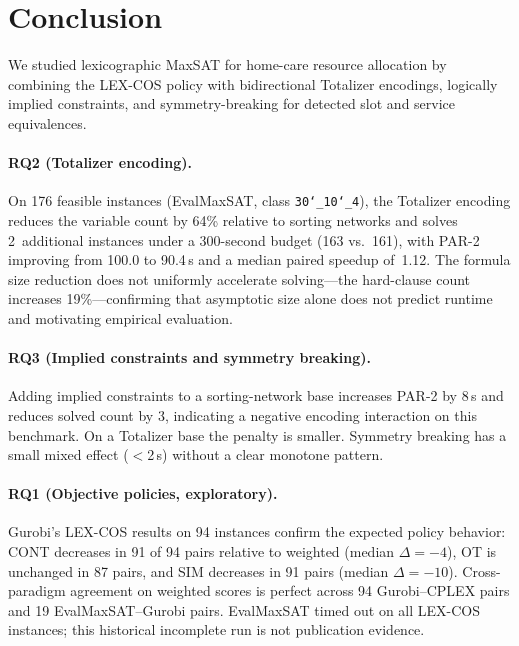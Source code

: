 
\section{Conclusion}
\label{sec:conclusion}

We studied lexicographic MaxSAT for home-care resource allocation by combining
the LEX-COS policy with bidirectional Totalizer encodings, logically implied
constraints, and symmetry-breaking for detected slot and service equivalences.

\paragraph{RQ2 (Totalizer encoding).}
On 176 feasible instances (EvalMaxSAT, class
\texttt{30\char`\_10\char`\_4}), the Totalizer encoding reduces the variable
count by 64\% relative to sorting networks and solves 2~additional instances
under a 300-second budget (163 vs.\ 161), with PAR-2 improving from 100.0 to
90.4\,s and a median paired speedup of~1.12.
The formula size reduction does not uniformly accelerate solving---the
hard-clause count increases 19\%---confirming that asymptotic size alone
does not predict runtime and motivating empirical evaluation.

\paragraph{RQ3 (Implied constraints and symmetry breaking).}
Adding implied constraints to a sorting-network base increases PAR-2 by 8\,s
and reduces solved count by 3, indicating a negative encoding interaction on
this benchmark.  On a Totalizer base the penalty is smaller.  Symmetry breaking
has a small mixed effect ($<$2\,s) without a clear monotone pattern.

\paragraph{RQ1 (Objective policies, exploratory).}
Gurobi's LEX-COS results on 94 instances confirm the expected policy behavior:
CONT decreases in 91 of 94 pairs relative to weighted (median $\Delta=-4$),
OT is unchanged in 87 pairs, and SIM decreases in 91 pairs (median $\Delta=-10$).
Cross-paradigm agreement on weighted scores is perfect across 94 Gurobi--CPLEX
pairs and 19 EvalMaxSAT--Gurobi pairs.  EvalMaxSAT timed out on all LEX-COS
instances; this historical incomplete run is not publication evidence.

